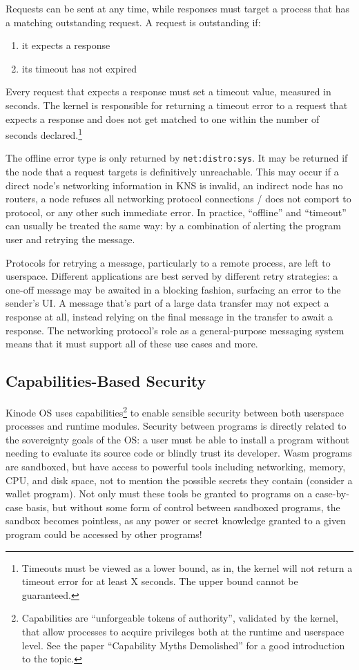 \documentclass[runningheads]{llncs}
\begin{document}
Requests can be sent at any time, while responses must target a process that has a matching outstanding request.
A request is outstanding if:
\begin{enumerate}
    \item it expects a response
    \item its timeout has not expired
\end{enumerate}
Every request that expects a response must set a timeout value, measured in seconds.
The kernel is responsible for returning a timeout error to a request that expects a response and does not get matched to one within the number of seconds declared.\footnote{Timeouts must be viewed as a lower bound, as in, the kernel will not return a timeout error for at least X seconds. The upper bound cannot be guaranteed.}

The offline error type is only returned by \verb|net:distro:sys|.
It may be returned if the node that a request targets is definitively unreachable.
This may occur if a direct node's networking information in KNS is invalid, an indirect node has no routers, a node refuses all networking protocol connections / does not comport to protocol, or any other such immediate error.
In practice, ``offline'' and ``timeout'' can usually be treated the same way: by a combination of alerting the program user and retrying the message.

Protocols for retrying a message, particularly to a remote process, are left to userspace.
Different applications are best served by different retry strategies:
a one-off message may be awaited in a blocking fashion, surfacing an error to the sender's UI.
A message that's part of a large data transfer may not expect a response at all, instead relying on the final message in the transfer to await a response.
The networking protocol's role as a general-purpose messaging system means that it must support all of these use cases and more.

\subsection{Capabilities-Based Security}
\label{sec:oscapabilities}

Kinode OS uses capabilities\footnote{Capabilities are ``unforgeable tokens of authority'', validated by the kernel, that allow processes to acquire privileges both at the runtime and userspace level.
See the paper ``Capability Myths Demolished'' for a good introduction to the topic.}
to enable sensible security between both userspace processes and runtime modules.
Security between programs is directly related to the sovereignty goals of the OS: a user must be able to install a program without needing to evaluate its source code or blindly trust its developer.
Wasm programs are sandboxed, but have access to powerful tools including networking, memory, CPU, and disk space, not to mention the possible secrets they contain (consider a wallet program).
Not only must these tools be granted to programs on a case-by-case basis, but without some form of control between sandboxed programs, the sandbox becomes pointless, as any power or secret knowledge granted to a given program could be accessed by other programs!
\end{document}
